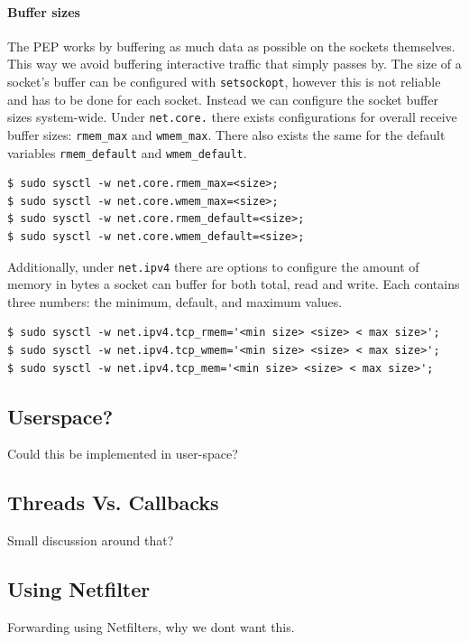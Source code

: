 \documentclass[a4paper,english, 11pt]{report}
\begin{document}
\paragraph{Buffer sizes}
The PEP works by buffering as much data as possible on the sockets themselves. This way we avoid buffering interactive traffic that simply passes by. The size of a socket's buffer can be configured with \verb|setsockopt|, however this is not reliable and has to be done for each socket. Instead we can configure the socket buffer sizes system-wide. Under \verb|net.core.| there exists configurations for overall receive buffer sizes: \verb|rmem_max| and \verb|wmem_max|. There also exists the same for the default variables \verb|rmem_default| and \verb|wmem_default|.\\

\begin{verbatim}
$ sudo sysctl -w net.core.rmem_max=<size>;
$ sudo sysctl -w net.core.wmem_max=<size>;
$ sudo sysctl -w net.core.rmem_default=<size>;
$ sudo sysctl -w net.core.wmem_default=<size>;
\end{verbatim}

Additionally, under \verb|net.ipv4| there are options to configure the amount of memory in bytes a socket can buffer for both total, read and write. Each contains three numbers: the minimum, default, and maximum values.


\begin{verbatim}
$ sudo sysctl -w net.ipv4.tcp_rmem='<min size> <size> < max size>';
$ sudo sysctl -w net.ipv4.tcp_wmem='<min size> <size> < max size>';
$ sudo sysctl -w net.ipv4.tcp_mem='<min size> <size> < max size>';
\end{verbatim}



\subsection{Userspace?}
Could this be implemented in user-space?

\subsection{Threads Vs. Callbacks}
Small discussion around that?


\subsection{Using Netfilter}
Forwarding using Netfilters, why we dont want this.
\end{document}
